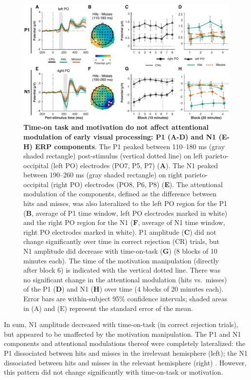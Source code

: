 \documentclass[11pt,]{memoir}
\begin{document}
\begin{figure}
\centering
\includegraphics{MFBrain_files/figures/figure_4_ERPs.pdf}
\caption{\label{fig:figure-4-ERPs}\textbf{Time-on task and motivation do not affect attentional modulation of early visual processing: P1 (A-D) and N1 (E-H) ERP components}. The P1 peaked between 110--180 ms (gray shaded rectangle) post-stimulus (vertical dotted line) on left parieto-occipital (left PO) electrodes (PO7, P5, P7) (\textbf{A}). The N1 peaked between 190--260 ms (gray shaded rectangle) on right parieto-occipital (right PO) electrodes (PO8, P6, P8) (\textbf{E}). The attentional modulation of the components, defined as the difference between hits and misses, was also lateralized to the left PO region for the P1 (\textbf{B}, average of P1 time window, left PO electrodes marked in white) and the right PO region for the N1 (\textbf{F}, average of N1 time window, right PO electrodes marked in white). P1 amplitude (\textbf{C}) did not change significantly over time in correct rejection (CR) trials, but N1 amplitude did decrease with time-on-task (\textbf{G}) (8 blocks of 10 minutes each). The time of the motivation manipulation (directly after block 6) is indicated with the vertical dotted line. There was no significant change in the attentional modulation (hits vs.~misses) of the P1 (\textbf{D}) and N1 (\textbf{H}) over time (4 blocks of 20 minutes each). Error bars are within-subject \autocites{Cousineau2005}{Morey2008} 95\% confidence intervals; shaded areas in (A) and (E) represent the standard error of the mean.}
\end{figure}

In sum, N1 amplitude decreased with time-on-task (in correct rejection trials), but appeared to be unaffected by the motivation manipulation. The P1 and N1 components and attentional modulations thereof were completely lateralized: the P1 dissociated between hits and misses in the irrelevant hemisphere (left); the N1 dissociated between hits and misses in the relevant hemisphere (right) \autocite[see][]{Slagter2016}. However, this pattern did not change significantly with time-on-task or motivation.
\end{document}
